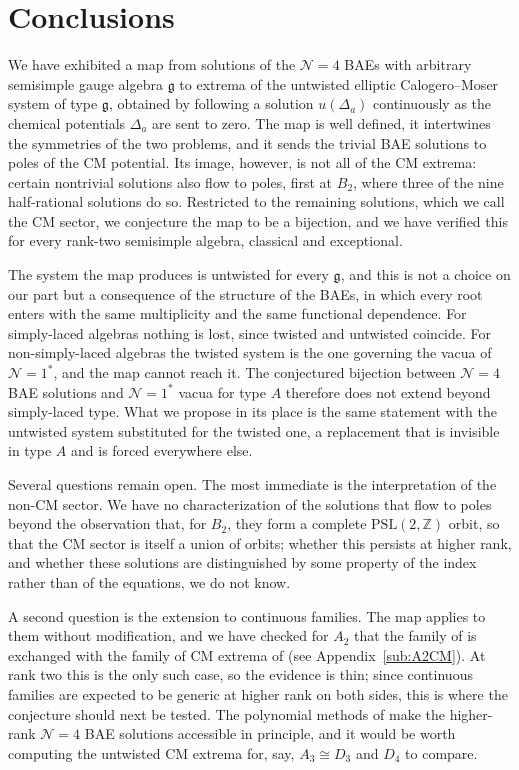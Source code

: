 \documentclass[aps, prx, nofootinbib, twocolumn,amsfonts,amsmath,amssymb,mathtools,superscriptaddress,preprintnumbers,floatfix,reprint]{revtex4-2}
\newcommand{\alg}{\mathfrak{g}}
\begin{document}
\section{Conclusions}
\label{sec:conclusions}

We have exhibited a map from solutions of the $\mathcal{N}=4$ BAEs with
arbitrary semisimple gauge algebra $\alg$ to extrema of the untwisted elliptic
Calogero--Moser system of type $\alg$, obtained by following a solution
$u(\Delta_a)$ continuously as the chemical potentials $\Delta_a$ are sent to zero. The map
is well defined, it intertwines the symmetries of the two problems, and it
sends the trivial BAE solutions to poles of the CM potential. Its image,
however, is not all of the CM extrema: certain nontrivial solutions also flow
to poles, first at $B_2$, where three of the nine half-rational solutions do
so. Restricted to the remaining solutions, which we call the CM sector, we
conjecture the map to be a bijection, and we have verified this for every
rank-two semisimple algebra, classical and exceptional.

The system the map produces is untwisted for every $\alg$, and this is not a
choice on our part but a consequence of the structure of the BAEs, in which
every root enters with the same multiplicity and the same functional
dependence. For simply-laced algebras nothing is lost, since twisted and
untwisted coincide. For non-simply-laced algebras the twisted system is the one
governing the vacua of $\mathcal{N}=1^\ast$, and the map cannot reach it. The
conjectured bijection between $\mathcal{N}=4$ BAE solutions and
$\mathcal{N}=1^\ast$ vacua for type $A$ \cite{ArabiArdehali:2019orz,Benini:2021ano} therefore
does not extend beyond simply-laced type. What we propose in its place is the
same statement with the untwisted system substituted for the twisted one, a
replacement that is invisible in type $A$ and is forced everywhere else.

Several questions remain open. The most immediate is the interpretation of the
non-CM sector. We have no characterization of the solutions that flow to poles
beyond the observation that, for $B_2$, they form a complete
$\mathrm{PSL}(2,\mathbb{Z})$ orbit, so that the CM sector is itself a union of
orbits; whether this persists at higher rank, and whether these solutions are
distinguished by some property of the index rather than of the equations, we do
not know.

A second question is the extension to continuous families. The map applies to
them without modification, and we have checked for $A_2$ that the family of
\cite{Benini:2021ano} is exchanged with the family of CM extrema of
\cite{Bourget:2015upj} (see Appendix~\ref{sub:A2CM}). At rank two this is the only such case, so the evidence
is thin; since continuous families are expected to be generic at higher rank on
both sides, this is where the conjecture should next be tested. The polynomial
methods of \cite{polypaper}
make the higher-rank $\mathcal{N}=4$ BAE solutions accessible in
principle, and it would be worth computing the untwisted CM extrema for, say,
$A_3\cong D_3$ and $D_4$ to compare.
\end{document}
